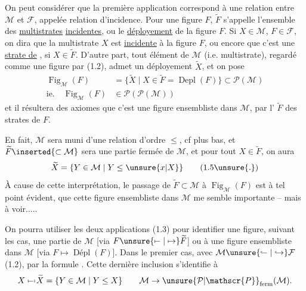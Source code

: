 On peut considérer que la première application correspond à une relation entre $\mathcal{M}$ et $\mathcal{F}$, appelée relation d'incidence. Pour une figure $F$, $\widetilde F$ s'appelle l'ensemble des \uline{multistrates} \uline{incidentes}, ou le \uline{déployement} de la figure $F$. Si $X\in\mathcal{M}$, $F\in\mathcal{F}$, on dira que la multistrate $X$ est \uline{incidente} à la figure $F$, ou encore que c'est une \uline{strate de} , si $X\in\widetilde F$. D'autre part, tout élément  de $\mathcal{M}$ (i.e.  multistrate), regardé comme une figure par (1.2), admet un déployement $\widetilde X$, et    on pose
\margin{$\unsure{\bullet|\cdot}$}
\[
\begin{aligned}
\operatorname{Fig}_{\mathcal{M}}(F)&=\{\widetilde X\mid X\in\widetilde F=\operatorname{Depl}(F)\}\subset\mathcal{P}(\mathcal{M})\\
\text{ie.}\quad \operatorname{Fig}_{\mathcal{M}}(F)&\in\mathcal{P}(\mathcal{P}(\mathcal{M}))
\end{aligned}\tag*{(1.4)}
\]
et il résultera des axiomes que c'est une figure ensembliste dans $\mathcal{M}$,   par l' $\widetilde F$ des strates de $F$.

  En fait, $\mathcal{M}$ sera muni d'une relation d'ordre $\leq$, cf plus bas, et $\widetilde F\inserted{\subset\mathcal{M}}$ sera une partie fermée de  $\mathcal{M}$, et pour tout $X\in\widetilde F$,  on aura
\[
\widetilde X=\{Y\in\mathcal{M}\mid Y\leq\unsure{x|X}\}\tag*{(1.5\unsure{.})}
\]
À cause de cette interprétation, le passage de $\widetilde F\subset\mathcal{M}$ à $\operatorname{Fig}_{\mathcal{M}}(F)$ est à tel point évident, que  cette figure ensembliste dans $\mathcal{M}$ me semble  importante -- mais à voir.....


On pourra utiliser les deux applications (1.3) pour identifier une figure, suivant les cas,  une partie de $\mathcal{M}$ [via $F\unsure{\mapstochar\relbar|\mapsto}\widetilde F$] ou à une figure ensembliste dans $\mathcal{M}$ [via $F\mapsto\operatorname{\text{Dépl}}(F)$]. Dans le premier cas,  avec $\mathcal{M}\unsure{\lhook\joinrel\relbar|\hookrightarrow}\mathcal{F}$ (1.2)\deleted{\unsure{(}}, par la formule . Cette dernière inclusion s'identifie à
\[
X\mathrel{\mapstochar\relbar\mapstochar}\widetilde X=\{Y\in\mathcal{M}\mid Y\leq X\}
\qquad \mathcal{M}\to\unsure{\mathcal{P}|\mathscr{P}}_{\mathrm{ferm}}(\mathcal{M}).
\]

